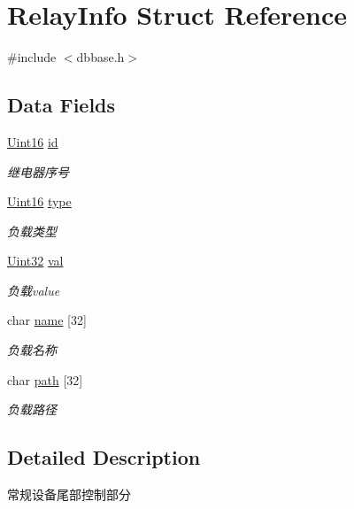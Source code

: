 \hypertarget{structRelayInfo}{\section{Relay\-Info Struct Reference}
\label{structRelayInfo}
}


{\ttfamily \#include $<$dbbase.\-h$>$}

\subsection*{Data Fields}
\begin{DoxyCompactItemize}
\item 
\hyperlink{base_8h_ae9f2e1f80fbd243687a04febbf590e13}{Uint16} \hyperlink{structRelayInfo_a664b6fde886aa5ec22584d57805989ba}{id}
\begin{DoxyCompactList}\small\item\em 继电器序号 \end{DoxyCompactList}\item 
\hyperlink{base_8h_ae9f2e1f80fbd243687a04febbf590e13}{Uint16} \hyperlink{structRelayInfo_a1f47e160c39504214a046234af05ff26}{type}
\begin{DoxyCompactList}\small\item\em 负载类型 \end{DoxyCompactList}\item 
\hyperlink{base_8h_a60cf7b3c038ce37a50796e8eaddf0b5f}{Uint32} \hyperlink{structRelayInfo_a4dc7bba5c5dd2ee1ff7172bae972936f}{val}
\begin{DoxyCompactList}\small\item\em 负载value \end{DoxyCompactList}\item 
char \hyperlink{structRelayInfo_a560c82273099e57eee9c873de36ec4d9}{name} \mbox{[}32\mbox{]}
\begin{DoxyCompactList}\small\item\em 负载名称 \end{DoxyCompactList}\item 
char \hyperlink{structRelayInfo_a9135480956d928283d45f91635aeefa1}{path} \mbox{[}32\mbox{]}
\begin{DoxyCompactList}\small\item\em 负载路径 \end{DoxyCompactList}\end{DoxyCompactItemize}


\subsection{Detailed Description}
常规设备尾部控制部分 

